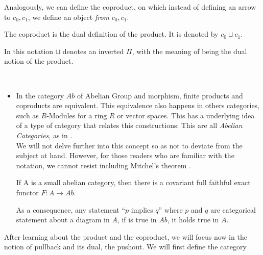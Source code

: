 Analogously, we can define the coproduct, on which instead of defining an arrow to $c_0, c_1$, we define an object \emph{from} $c_0,c_1$. 
\begin{definition}
  The coproduct is the dual definition of the product. It is denoted by $c_0 \sqcup c_1$.
\end{definition}
 In this notation $\sqcup$ denotes an inverted $\Pi$, with the meaning of being the dual notion of the product.
\begin{example}\ \label{example:mitchell}
  \begin{itemize}
  \item In the category $Ab$ of Abelian Group and morphism, finite products and coproducts are equivalent. This equivalence also happens in others categories, such as $R$-Modules for a ring $R$ or vector spaces. This has a underlying idea of a type of category that relates this constructions: This are all \emph{Abelian Categories}, as in \cite[Section 5.5]{rotman2008introduction}.\\

    We will not delve further into this concept so as not to deviate from the subject at hand. However, for those readers who are familiar with the notation, we cannot resist including Mitchel's theorem\cite[Chapter IV]{mitchell1965theory} .

    \begin{theorem} If A is a small abelian category, then there is a covariant full faithful exact functor $F : A \to Ab$.
    \end{theorem}

    As a consequence, any statement ``$p$ implies $q$'' where $p$ and $q$ are categorical statement about a diagram in $A$, if is true in  $Ab$, it holds true in $A$.
  \end{itemize}
\end{example}





After learning about the product and the coproduct, we will focus now in the notion of pullback and its dual, the pushout. We will first define the category

